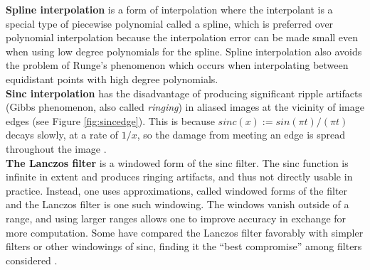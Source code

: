 \documentclass[]{usiinfbachelorproject}
\begin{document}
{\bf Spline interpolation} is a form of interpolation where the interpolant is a special type of piecewise polynomial called a spline, which is preferred over polynomial interpolation because the interpolation error can be made small even when using low degree polynomials for the spline. Spline interpolation also avoids the problem of Runge's phenomenon \cite{Runge1901} which occurs when interpolating between equidistant points with high degree polynomials.\\

{\bf Sinc interpolation} has the disadvantage of producing significant ripple artifacts (Gibbs phenomenon, also called \emph{ringing}) in aliased images at the vicinity of image edges (see Figure \ref{fig:sincedge}). This is because $sinc(x):=sin(\pi t)/(\pi t)$ decays slowly, at a rate of $1/x$, so the damage from meeting an edge is spread throughout the image \cite{Getreuer2011}.\\

{\bf The Lanczos filter} is a windowed form of the sinc filter. The sinc function is infinite in extent and produces ringing artifacts, and thus not directly usable in practice. Instead, one uses approximations, called windowed forms of the filter and the Lanczos filter is one such windowing. The windows vanish outside of a range, and using larger ranges allows one to improve accuracy in exchange for more computation. Some have compared the Lanczos filter favorably with simpler filters or other windowings of sinc, finding it the ``best compromise'' among filters considered \cite{Turkowski1990}.
\end{document}
